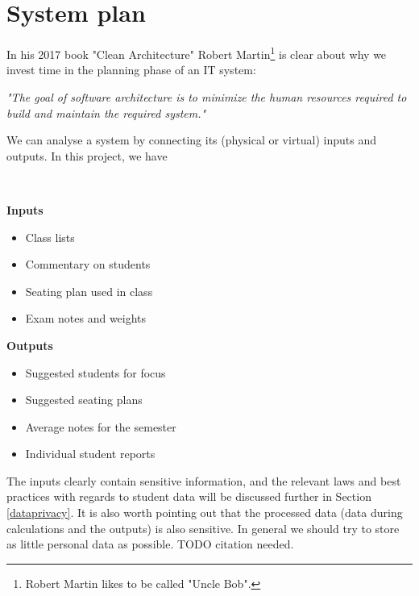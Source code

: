 \documentclass[10pt]{article}
\begin{document}
\section{System plan} \label{inout}

In his 2017 book "Clean Architecture" Robert Martin\footnote{Robert Martin likes to be called "Uncle Bob".} is clear about why we invest time in the planning phase of an IT system:
\begin{center}
\emph{"The goal of software architecture is to minimize the human resources required to build and maintain the required system."} \cite[p. 5]{Mart17}
\end{center}


We can analyse a system by connecting its (physical or virtual) inputs and outputs. In this project, we have

\

\begin{minipage}[t]{0.38\textwidth}

\textbf{Inputs}

\begin{itemize}
\item Class lists
\item Commentary on students
\item Seating plan used in class
\item Exam notes and weights
\end{itemize}


\end{minipage}
\hfill
\vline
\hfill
\begin{minipage}[t]{0.48\textwidth}

\textbf{Outputs}

\begin{itemize}
\item Suggested students for focus
\item Suggested seating plans
\item Average notes for the semester
\item Individual student reports
\end{itemize}

\end{minipage}

\vspace{5mm}

The inputs clearly contain sensitive information, and the relevant laws and best practices with regards to student data will be discussed further in Section \ref{dataprivacy}. It is also worth pointing out that the processed data (data during calculations and the outputs) is also sensitive. In general we should try to store as little personal data as possible. TODO citation needed.
\end{document}
